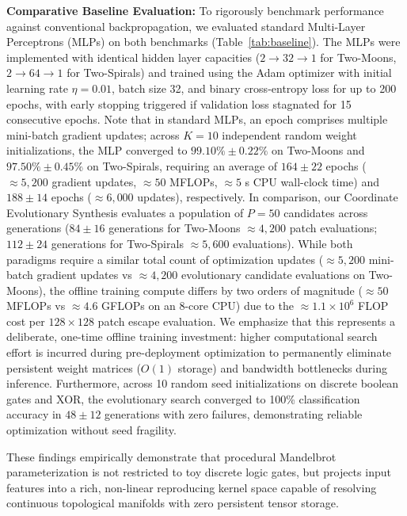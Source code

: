 \documentclass[10pt,journal,compsoc,twocolumn]{article}
\begin{document}
\textbf{Comparative Baseline Evaluation:} To rigorously benchmark performance against conventional backpropagation, we evaluated standard Multi-Layer Perceptrons (MLPs) on both benchmarks (Table~\ref{tab:baseline}). The MLPs were implemented with identical hidden layer capacities ($2 \to 32 \to 1$ for Two-Moons, $2 \to 64 \to 1$ for Two-Spirals) and trained using the Adam optimizer with initial learning rate $\eta = 0.01$, batch size 32, and binary cross-entropy loss for up to 200 epochs, with early stopping triggered if validation loss stagnated for 15 consecutive epochs. Note that in standard MLPs, an epoch comprises multiple mini-batch gradient updates; across $K=10$ independent random weight initializations, the MLP converged to $99.10\% \pm 0.22\%$ on Two-Moons and $97.50\% \pm 0.45\%$ on Two-Spirals, requiring an average of $164 \pm 22$ epochs ($\approx 5,200$ gradient updates, $\approx 50$ MFLOPs, $\approx 5$ s CPU wall-clock time) and $188 \pm 14$ epochs ($\approx 6,000$ updates), respectively. In comparison, our Coordinate Evolutionary Synthesis evaluates a population of $P=50$ candidates across generations ($84 \pm 16$ generations for Two-Moons $\approx 4,200$ patch evaluations; $112 \pm 24$ generations for Two-Spirals $\approx 5,600$ evaluations). While both paradigms require a similar total count of optimization updates ($\approx 5,200$ mini-batch gradient updates vs $\approx 4,200$ evolutionary candidate evaluations on Two-Moons), the offline training compute differs by two orders of magnitude ($\approx 50$ MFLOPs vs $\approx 4.6$ GFLOPs on an 8-core CPU) due to the $\approx 1.1 \times 10^6$ FLOP cost per $128 \times 128$ patch escape evaluation. We emphasize that this represents a deliberate, one-time offline training investment: higher computational search effort is incurred during pre-deployment optimization to permanently eliminate persistent weight matrices ($O(1)$ storage) and bandwidth bottlenecks during inference. Furthermore, across 10 random seed initializations on discrete boolean gates and XOR, the evolutionary search converged to 100\% classification accuracy in $48 \pm 12$ generations with zero failures, demonstrating reliable optimization without seed fragility.

These findings empirically demonstrate that procedural Mandelbrot parameterization is not restricted to toy discrete logic gates, but projects input features into a rich, non-linear reproducing kernel space capable of resolving continuous topological manifolds with zero persistent tensor storage.
\end{document}
